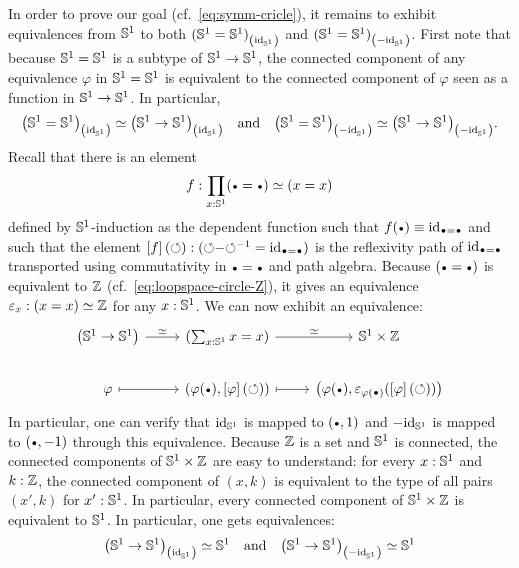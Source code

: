 \documentclass[english,a4paper]{lmcs}
\begin{document}
In order to prove our goal (cf.~\cref{eq:symm-cricle}), it remains to
exhibit equivalences from ${{\mathbb S^{1}}}$ to both
${({{\mathbb S^{1}}}={{\mathbb S^{1}}})}_{\left(\mathord{\mathrm{id}}_{{\mathbb S^{1}}}\right)}$ and
${({{\mathbb S^{1}}}={{\mathbb S^{1}}})}_{\left(-\mathord{\mathrm{id}}_{{\mathbb S^{1}}}\right)}$. First note that because ${{\mathbb S^{1}}}={{\mathbb S^{1}}}$ is
a subtype of ${{\mathbb S^{1}}}\to{{\mathbb S^{1}}}$, the connected component of any equivalence
$\varphi$ in ${{\mathbb S^{1}}}={{\mathbb S^{1}}}$ is equivalent to the connected component of
$\varphi$ seen as a function in ${{\mathbb S^{1}}} \to {{\mathbb S^{1}}}$. In particular,
\begin{displaymath}
  {\left({{\mathbb S^{1}}}={{\mathbb S^{1}}}\right)}_{\left(\mathord{\mathrm{id}}_{{\mathbb S^{1}}}\right)} \simeq {\left({{\mathbb S^{1}}}\to{{\mathbb S^{1}}}\right)}_{\left(\mathord{\mathrm{id}}_{{\mathbb S^{1}}}\right)}
  \quad\text{and}\quad
  {\left({{\mathbb S^{1}}}={{\mathbb S^{1}}}\right)}_{\left(-\mathord{\mathrm{id}}_{{\mathbb S^{1}}}\right)} \simeq {\left({{\mathbb S^{1}}}\to{{\mathbb S^{1}}}\right)}_{\left(-\mathord{\mathrm{id}}_{{\mathbb S^{1}}}\right)}.
\end{displaymath}
Recall that there is an element
\begin{equation}
  \label{eq:S1-loopspace-Z-at-each-x}%
  f\from \prod_{x:\Sc} (\base=\base) \weq (x=x)
\end{equation}
defined by
${{\mathbb S^{1}}}$-induction as the dependent function such that
$f(\base) \jdeq \id_{\base=\base}$ and such that the element
$\ap f (\Sloop) \from (\Sloop\blank\inv\Sloop = \id_{\base=\base})$ is
the reflexivity path of $\id_{\base=\base}$ transported using
commutativity in $\base=\base$ and path algebra.
Because $(\base=\base)$ is equivalent
to $\mathbb{Z}$ (cf.~\cref{eq:loopspace-circle-Z}), it gives an equivalence
$\varepsilon_x: (x=x) \simeq \mathbb{Z}$ for any $x:{{\mathbb S^{1}}}$. We can now
exhibit an equivalence:
\begin{displaymath}
  \begin{tikzcd}
    \left(\Sc \to \Sc\right) \rar["\weq"] & (\sum_{x\from\Sc}x=x)
    \rar["\weq"] & \Sc \times \ZZ
    \\
    \varphi \rar[mapsto] & (\varphi(\base),\ap \varphi (\Sloop))
    \rar[mapsto] & \left(%
      \varphi(\base), \varepsilon_{\varphi(\base)}(\ap\varphi(\Sloop))%
    \right)%
\end{tikzcd}
\end{displaymath}
In particular, one can verify that $\mathord{\mathrm{id}}_{{\mathbb S^{1}}}$ is mapped to $(\base,1)$
and $-\mathord{\mathrm{id}}_{{\mathbb S^{1}}}$ is mapped to $(\base,-1)$ through this
equivalence. Because $\mathbb{Z}$ is a set and ${{\mathbb S^{1}}}$ is connected, the
connected components of ${{\mathbb S^{1}}}\times\mathbb{Z}$ are easy to understand: for
every $x:{{\mathbb S^{1}}}$ and $k:\mathbb{Z}$, the connected component of $(x,k)$ is
equivalent to the type of all pairs $(x',k)$ for
$x':{{\mathbb S^{1}}}$. In particular, every connected component of
${{\mathbb S^{1}}}\times\mathbb{Z}$ is equivalent to ${{\mathbb S^{1}}}$. In particular, one gets
equivalences:
\begin{displaymath}
  {\left({{\mathbb S^{1}}}\to {{\mathbb S^{1}}}\right)}_{\left(\mathord{\mathrm{id}}_{{\mathbb S^{1}}}\right)} \simeq {{\mathbb S^{1}}}
  \quad\text{and}\quad
  {\left({{\mathbb S^{1}}}\to {{\mathbb S^{1}}}\right)}_{\left(-\mathord{\mathrm{id}}_{{\mathbb S^{1}}}\right)} \simeq {{\mathbb S^{1}}}
\end{displaymath}
\end{document}
